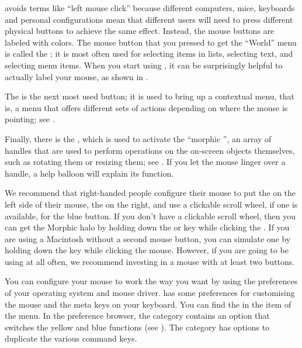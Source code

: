 \documentclass[a4paper,10pt,twoside]{book}
\begin{document}
\sq avoids terms like ``left mouse click'' because different computers, mice, keyboards and personal configurations mean that different users will need to press different physical buttons to achieve the same effect.  Instead, the mouse buttons are labeled with colors.  The mouse button that you pressed to get the ``World'' menu is called the ; it is most often used for selecting items in lists, selecting text, and selecting menu items.
When you start using \sq, it can be surprisingly helpful to actually label your mouse, as shown in .

The  is the next most used button; it is used to bring up a contextual menu, that is, a menu that offers different sets of actions depending on where the mouse is pointing; see .



Finally, there is the , which is used to activate the ``morphic '', an array of handles that are used to perform operations on the on-screen objects themselves, such as rotating them or resizing them; see . 
If you let the mouse linger over a handle, a help balloon will explain its function.


We recommend that right-handed people configure their mouse to put the  on the left side of their mouse, the  on the right, and use a clickable scroll wheel, if one is available, for the blue button.  If you don't have a clickable scroll wheel, then you can get the Morphic halo by holding down the  or  key while clicking the .  If you are using a Macintosh without a second mouse button, you can simulate one by holding down the \clover{} key while clicking the mouse.  However, if you are going to be using \sq at all often, we recommend investing in a mouse with at least two buttons.

You can configure your mouse to work the way you want by using the preferences of your operating system and mouse driver.
\sq has some preferences for customising the mouse and the meta keys on your keyboard. You can find the  in the  item of the  menu. 
In the preference browser, the  category contains an option  that switches the yellow and blue functions (see ).  The  category has options to duplicate the various command keys.   
\end{document}
